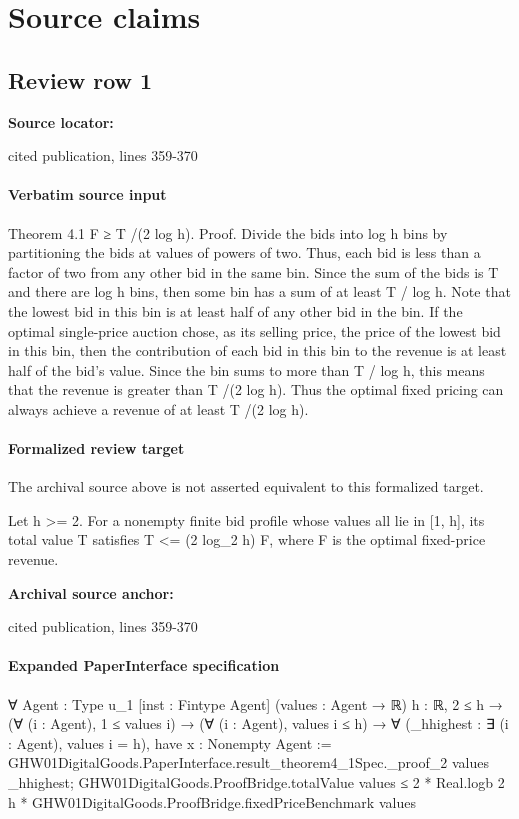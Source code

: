 \documentclass[10pt]{article}
\begin{document}
\clearpage
\hypertarget{source-claim-2bea065aff29fbec}{}
\hypertarget{source-section-f10b5f68e4acf3dc}{}
\section*{Source claims}
\subsection*{Review row 1}
\textbf{Source locator:} {\footnotesize\raggedright cited publication, lines 359-\allowbreak{}370\par}
\paragraph{Verbatim source input}
\begin{ReviewVerbatim}
Theorem 4.1 F ≥ T /(2 log h).
Proof. Divide the bids into log h bins by partitioning the bids at values of powers of two. Thus, each
bid is less than a factor of two from any other bid
in the same bin. Since the sum of the bids is T and
there are log h bins, then some bin has a sum of at
least T / log h. Note that the lowest bid in this bin is
at least half of any other bid in the bin. If the optimal single-price auction chose, as its selling price, the
price of the lowest bid in this bin, then the contribution of each bid in this bin to the revenue is at least
half of the bid’s value. Since the bin sums to more
than T / log h, this means that the revenue is greater
than T /(2 log h). Thus the optimal fixed pricing can
always achieve a revenue of at least T /(2 log h).
\end{ReviewVerbatim}


\paragraph{Formalized review target}
The archival source above is not asserted equivalent to this formalized target.
\begin{ReviewVerbatim}
Let h >= 2. For a nonempty finite bid profile whose values all lie in [1, h], its total value T satisfies T <= (2 log_2 h) F, where F is the optimal fixed-price revenue.
\end{ReviewVerbatim}

\textbf{Archival source anchor:} {\footnotesize\raggedright cited publication, lines 359-\allowbreak{}370\par}
\paragraph{Expanded PaperInterface specification}
\begin{ReviewVerbatim}
∀ {Agent : Type u_1} [inst : Fintype Agent] (values : Agent → ℝ) {h : ℝ},
  2 ≤ h →
    (∀ (i : Agent), 1 ≤ values i) →
      (∀ (i : Agent), values i ≤ h) →
        ∀ (_hhighest : ∃ (i : Agent), values i = h),
          have x : Nonempty Agent := GHW01DigitalGoods.PaperInterface.result_theorem4_1Spec._proof_2 values _hhighest;
          GHW01DigitalGoods.ProofBridge.totalValue values ≤
            2 * Real.logb 2 h * GHW01DigitalGoods.ProofBridge.fixedPriceBenchmark values
\end{ReviewVerbatim}
\end{document}

